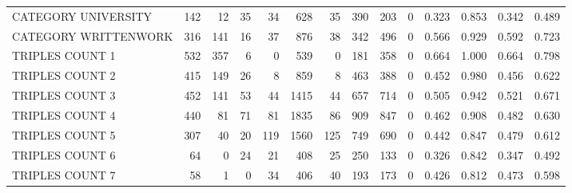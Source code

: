 \begin{tabular}{lrrrrrrrrrllll}
 CATEGORY UNIVERSITY      &             142 &            12 &              35 &              34 &             628 &   35 &  390 &  203 &    0 & 0.323 & 0.853 & 0.342 & 0.489 \\
 CATEGORY WRITTENWORK     &             316 &           141 &              16 &              37 &             876 &   38 &  342 &  496 &    0 & 0.566 & 0.929 & 0.592 & 0.723 \\
 TRIPLES COUNT 1          &             532 &           357 &               6 &               0 &             539 &    0 &  181 &  358 &    0 & 0.664 & 1.000 & 0.664 & 0.798 \\
 TRIPLES COUNT 2          &             415 &           149 &              26 &               8 &             859 &    8 &  463 &  388 &    0 & 0.452 & 0.980 & 0.456 & 0.622 \\
 TRIPLES COUNT 3          &             452 &           141 &              53 &              44 &            1415 &   44 &  657 &  714 &    0 & 0.505 & 0.942 & 0.521 & 0.671 \\
 TRIPLES COUNT 4          &             440 &            81 &              71 &              81 &            1835 &   86 &  909 &  847 &    0 & 0.462 & 0.908 & 0.482 & 0.630 \\
 TRIPLES COUNT 5          &             307 &            40 &              20 &             119 &            1560 &  125 &  749 &  690 &    0 & 0.442 & 0.847 & 0.479 & 0.612 \\
 TRIPLES COUNT 6          &              64 &             0 &              24 &              21 &             408 &   25 &  250 &  133 &    0 & 0.326 & 0.842 & 0.347 & 0.492 \\
 TRIPLES COUNT 7          &              58 &             1 &               0 &              34 &             406 &   40 &  193 &  173 &    0 & 0.426 & 0.812 & 0.473 & 0.598 \\
\hline
\end{tabular}